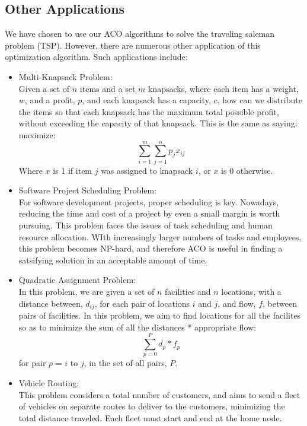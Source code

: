 \documentclass[11pt,twocolumn]{article}
\begin{document}
\subsection{Other Applications}
We have chosen to use our ACO algorithms to solve the traveling saleman problem (TSP). However, there are numerous other application of this optimization algorithm. Such applications include:
\begin{itemize}
\item Multi-Knapsack Problem:\\
Given a set of $n$ items and a set $m$ knapsacks, where each item has a weight, $w$, and a profit, $p$, and each knapsack has a capacity, $c$, how can we distribute the items so that each knapsack has the maximum total possible profit, without exceeding the capacity of that knapsack. This is the same as saying:\\
maximize:
$$\sum_{i = 1} ^{m} \sum_{j = 1} ^{n} p_j x_{ij}$$
Where $x$ is 1 if item $j$ was assigned to knapsack $i$, or $x$ is 0 otherwise.
\item Software Project Scheduling Problem:\\
For software development projects, proper scheduling is key. Nowadays, reducing the time and cost of a project by even a small margin is worth pursuing. This problem faces the issues of task scheduling and human resource allocation. WIth increasingly larger numbers of tasks and employees, this problem becomes NP-hard, and therefore ACO is useful in finding a satsifying solution in an acceptable amount of time.
\item Quadratic Assignment Problem: \\
In this problem, we are given a set of $n$ facilities and $n$ locations, with a distance between, $d_{ij}$, for each pair of locations $i$ and $j$, and flow, $f$, between pairs of facilities. In this problem, we aim to find locations for all the facilites so as to minimize the sum of all the distances * appropriate flow:
$$\sum_{p = 0} ^{P} d_{p} * f_{p}$$
for pair $p$ = $i$ to $j$, in the set of all pairs, $P$.
\item Vehicle Routing: \\
This problem considers a total number of customers, and aims to send a fleet of vehicles on separate routes to deliver to the customers, minimizing the total distance traveled. Each fleet must start and end at the home node. 

\end{itemize}

\end{document}
